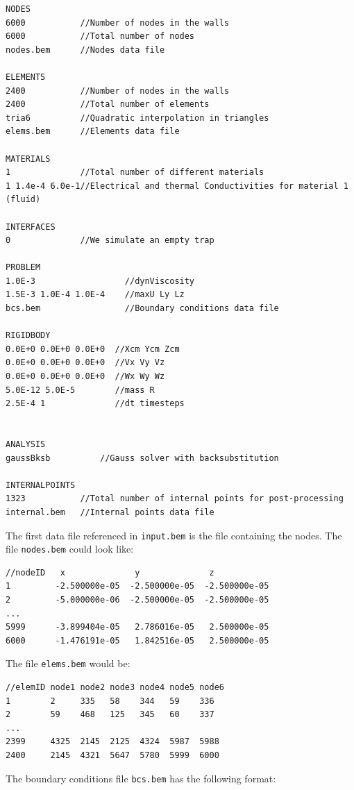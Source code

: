 \documentclass[12pt]{article}
\begin{document}
\small\begin{verbatim}
NODES
6000           //Number of nodes in the walls
6000           //Total number of nodes   
nodes.bem      //Nodes data file

ELEMENTS
2400           //Number of nodes in the walls
2400           //Total number of elements
tria6          //Quadratic interpolation in triangles
elems.bem      //Elements data file

MATERIALS
1              //Total number of different materials
1 1.4e-4 6.0e-1//Electrical and thermal Conductivities for material 1 (fluid)

INTERFACES
0              //We simulate an empty trap

PROBLEM
1.0E-3                  //dynViscosity
1.5E-3 1.0E-4 1.0E-4    //maxU Ly Lz
bcs.bem                 //Boundary conditions data file

RIGIDBODY
0.0E+0 0.0E+0 0.0E+0  //Xcm Ycm Zcm
0.0E+0 0.0E+0 0.0E+0  //Vx Vy Vz
0.0E+0 0.0E+0 0.0E+0  //Wx Wy Wz
5.0E-12 5.0E-5        //mass R
2.5E-4 1              //dt timesteps


ANALYSIS
gaussBksb	       //Gauss solver with backsubstitution 

INTERNALPOINTS
1323           //Total number of internal points for post-processing
internal.bem   //Internal points data file
\end{verbatim}\normalsize

The first data file referenced in \verb+input.bem+ is the file containing the nodes. The file \verb+nodes.bem+ could look like:

\small\begin{verbatim}
//nodeID   x              y              z
1         -2.500000e-05  -2.500000e-05  -2.500000e-05
2         -5.000000e-06  -2.500000e-05  -2.500000e-05
...
5999      -3.899404e-05   2.786016e-05   2.500000e-05
6000      -1.476191e-05   1.842516e-05   2.500000e-05
\end{verbatim}\normalsize

The file \verb+elems.bem+ would be:

\small\begin{verbatim}
//elemID node1 node2 node3 node4 node5 node6
1        2     335   58    344   59    336
2        59    468   125   345   60    337
...
2399     4325  2145  2125  4324  5987  5988
2400     2145  4321  5647  5780  5999  6000
\end{verbatim}\normalsize

The boundary conditions file \verb+bcs.bem+ has the following format:
\end{document}
